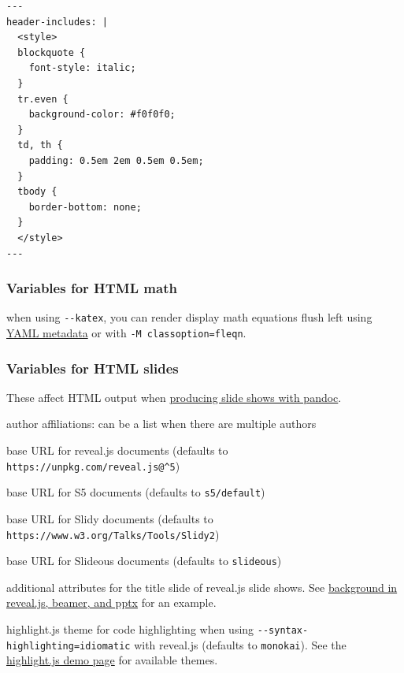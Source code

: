 \documentclass[
]{article}
\providecommand{\tightlist}{%
  \setlength{\itemsep}{0pt}\setlength{\parskip}{0pt}}
\begin{document}
\begin{verbatim}
---
header-includes: |
  <style>
  blockquote {
    font-style: italic;
  }
  tr.even {
    background-color: #f0f0f0;
  }
  td, th {
    padding: 0.5em 2em 0.5em 0.5em;
  }
  tbody {
    border-bottom: none;
  }
  </style>
---
\end{verbatim}

\hypertarget{variables-for-html-math}{%
\subsubsection{Variables for HTML math}\label{variables-for-html-math}}

\begin{description}
\tightlist
\item[\texttt{classoption}]
when using \texttt{-\/-katex}, you can render display math equations
flush left using \protect\hyperlink{layout}{YAML metadata} or with
\texttt{-M\ classoption=fleqn}.
\end{description}

\hypertarget{variables-for-html-slides}{%
\subsubsection{Variables for HTML
slides}\label{variables-for-html-slides}}

These affect HTML output when \protect\hyperlink{slide-shows}{producing
slide shows with pandoc}.

\begin{description}
\tightlist
\item[\texttt{institute}]
author affiliations: can be a list when there are multiple authors
\item[\texttt{revealjs-url}]
base URL for reveal.js documents (defaults to
\texttt{https://unpkg.com/reveal.js@\^{}5})
\item[\texttt{s5-url}]
base URL for S5 documents (defaults to \texttt{s5/default})
\item[\texttt{slidy-url}]
base URL for Slidy documents (defaults to
\texttt{https://www.w3.org/Talks/Tools/Slidy2})
\item[\texttt{slideous-url}]
base URL for Slideous documents (defaults to \texttt{slideous})
\item[\texttt{title-slide-attributes}]
additional attributes for the title slide of reveal.js slide shows. See
\protect\hyperlink{background-in-reveal.js-beamer-and-pptx}{background
in reveal.js, beamer, and pptx} for an example.
\item[\texttt{highlightjs-theme}]
highlight.js theme for code highlighting when using
\texttt{-\/-syntax-highlighting=idiomatic} with reveal.js (defaults to
\texttt{monokai}). See the
\href{https://highlightjs.org/demo}{highlight.js demo page} for
available themes.
\end{description}
\end{document}
